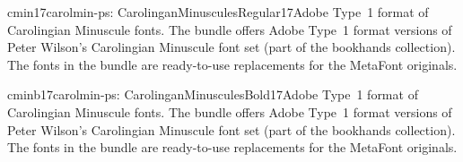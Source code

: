 \documentclass{ddltxtyp}
\begin{document}
\begin{package}{cmin17}{carolmin-ps: CarolinganMinusculesRegular17}{Adobe Type~1 format of Carolingian Minuscule fonts.}
The bundle offers Adobe Type~1 format versions of Peter
Wilson's Carolingian Minuscule font set (part of the bookhands
collection). The fonts in the bundle are ready-to-use
replacements for the MetaFont originals.
\end{package}
\begin{package}{cminb17}{carolmin-ps: CarolinganMinusculesBold17}{Adobe Type~1 format of Carolingian Minuscule fonts.}
The bundle offers Adobe Type~1 format versions of Peter
Wilson's Carolingian Minuscule font set (part of the bookhands
collection). The fonts in the bundle are ready-to-use
replacements for the MetaFont originals.
\end{package}


\end{document}
